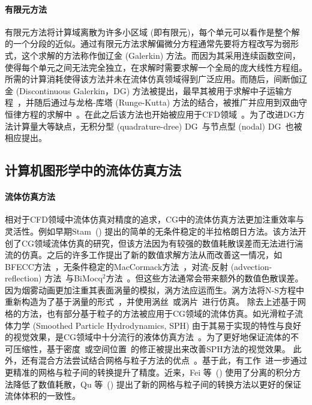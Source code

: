 \paragraph{有限元方法}
有限元方法将计算域离散为许多小区域 (即有限元)，每个单元可以看作是整个解的一个分段的近似。通过有限元方法求解偏微分方程通常先要将方程改写为弱形式，这个求解的方法称作伽辽金 (Galerkin) 方法。而因为其采用连续函数空间，使得每个单元之间无法完全独立，在求解时需要求解一个全局的庞大线性方程组。所需的计算消耗使得该方法并未在流体仿真领域得到广泛应用。而随后，间断伽辽金 (Discontinuous Galerkin，DG) 方法被提出，最早其被用于求解中子运输方程~\cite{reed1973triangular}，并随后通过与龙格-库塔 (Runge-Kutta) 方法的结合，被推广并应用到双曲守恒律方程的求解中~\cite{cockburn2001runge, cockburn1990runge, cockburn1989tvb2, cockburn1989tvb3}。在此之后该方法也开始被应用于CFD领域~\cite{Zienkiewicz-2013, lomtev1999discontinuous, bassi1997high}。为了改进DG方法计算量大等缺点，无积分型 (quadrature-dree) DG~\cite{atkins1998quadrature}与节点型 (nodal) DG~\cite{hesthaven2007nodal}也被相应提出。

\subsection{计算机图形学中的流体仿真方法}
\paragraph{流体仿真方法}
相对于CFD领域中流体仿真对精度的追求，CG中的流体仿真方法更加注重效率与灵活性。例如早期Stam~(\citeyear{Stam-1999}) 提出的简单的无条件稳定的半拉格朗日方法。该方法开创了CG领域流体仿真的研究，但该方法因为有较强的数值耗散误差而无法进行湍流的仿真。之后的许多工作提出了新的数值求解方法从而改善这一情况，如BFECC方法~\cite{Kim-2005}，无条件稳定的MacCormack方法~\cite{Selle-2008}，对流-反射 (advection-reflection) 方法~\cite{Zehnder-2018}与BiMocq$^2$方法~\cite{Qu-2019}。但这些方法通常会带来额外的数值色散误差。
因为烟雾动画更加注重其表面涡量的模拟，涡方法应运而生。涡方法将N-S方程中重新构造为了基于涡量的形式~\cite{Park-2005, Selle-2005}，并使用涡丝~\cite{Angelidis-2005, Weissmann-2010}或涡片~\cite{Pfaff-2012, Zhang-2014, Zhang-2015}进行仿真。
除去上述基于网格的方法，也有部分基于粒子的方法被应用于CG领域的流体仿真。如光滑粒子流体力学 (Smoothed Particle Hydrodynamics, SPH) 由于其易于实现的特性与良好的视觉效果，是CG领域中十分流行的液体仿真方法~\cite{Desbrun-1996,Muller-2003,Adams-2007,Becker-2007,Ihmsen-2014-1}。为了更好地保证流体的不可压缩性，基于密度~\cite{Solenthaler-2009, Bender-2015, Ihmsen-2014-2}或空间位置~\cite{Macklin-2013}的修正被提出来改善SPH方法的视觉效果。
此外，还有混合方法尝试结合网格与粒子方法的优点~\cite{Harlow-1962, Brackbill-1986, Foster-1996, Zhu-2005}。基于此，有工作~\cite{Jiang-2015, Fu-2017}进一步通过更精准的网格与粒子间的转换提升了精度。近来，Fei 等~(\citeyear{Fei-2021}) 使用了分离的积分方法降低了数值耗散，Qu 等~(\citeyear{Qu-2022}) 提出了新的网格与粒子间的转换方法以更好的保证流体体积的一致性。

